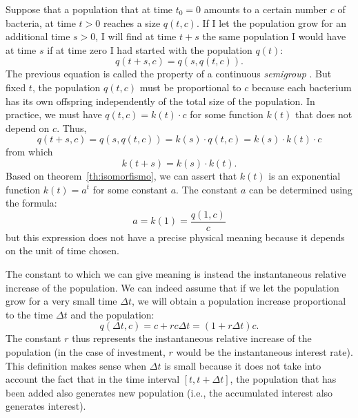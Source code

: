 Suppose that a population that at time $t_0=0$
amounts to a certain number $c$ of bacteria, at time
$t>0$ reaches a size $q(t,c)$.
If I let the population grow for an additional
time $s>0$, I will find at time $t+s$ the same
population I would have at time $s$ if at time
zero I had started with the population $q(t)$:
\[
  q(t+s,c) = q(s,q(t,c)).
\]
The previous equation is called the property
of a continuous \emph{semigroup}%
.
But fixed $t$, the population $q(t,c)$ must
be proportional to $c$ because each bacterium
has its own offspring independently of the total size
of the population. In practice,
we must have $q(t,c) = k(t) \cdot c$ for some
function $k(t)$ that does not depend on $c$.
Thus,
\[
  q(t+s,c)
  = q(s,q(t,c))
  = k(s) \cdot q(t,c)
  = k(s) \cdot k(t) \cdot c
\]
from which
\[
  k(t+s) = k(s) \cdot k(t).
\]
Based on theorem~\ref{th:isomorfismo},
we can assert
that $k(t)$ is an exponential function $k(t)=a^t$
for some constant $a$.
The constant $a$ can be determined using the formula:
\[
  a = k(1) = \frac{q(1,c)}{c}
\]
but this expression does not have a precise physical meaning because
it depends on the unit of time chosen.

The constant to which we can give meaning is instead the instantaneous relative
increase of the population. We can indeed assume that
if we let the population grow for a very small time $\Delta t$,
we will obtain a population increase proportional to the time $\Delta t$
and the population:%
\begin{equation}\label{eq:488464}
  q(\Delta t,c) = c + r c \Delta t = (1+r \Delta t) c.
\end{equation}
The constant $r$ thus represents the instantaneous
relative increase of the population (in the case of investment,
$r$ would be the instantaneous interest rate).
This definition makes sense
when $\Delta t$ is small because it does not take into account the fact that
in the time interval $[t,t+\Delta t]$, the population that has
been added also generates new population (i.e., the accumulated interest
also generates interest).

